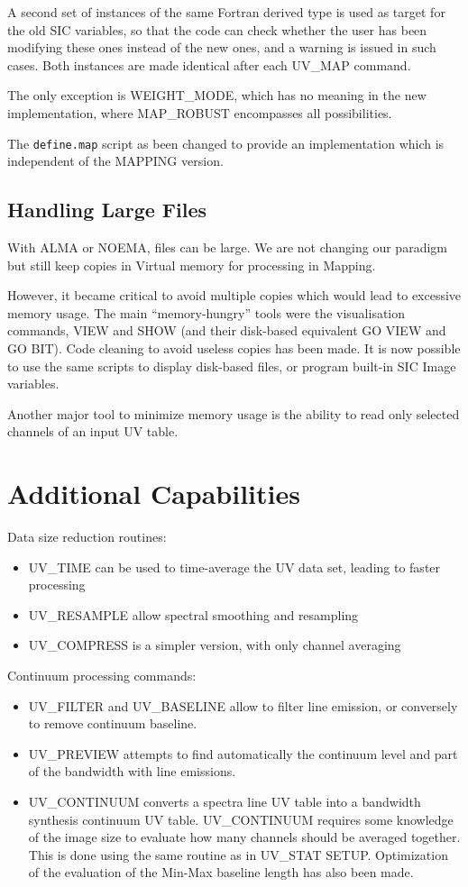 \documentclass[11pt]{article}
\begin{document}
A second set of instances of the same Fortran derived type is used as target
for the old SIC variables, so that the code can check whether the user has been
modifying these ones instead of the new ones, and a warning is issued in such cases.
Both instances are made identical after each UV\_MAP command.

The only exception is WEIGHT\_MODE, which has no meaning in the new implementation,
where MAP\_ROBUST encompasses all possibilities.

The  \texttt{define.map} script as been changed to provide an implementation which
is independent of the MAPPING version.

\subsection{Handling Large Files}
With ALMA or NOEMA, files can be large. We are not changing our paradigm
but still keep copies in Virtual memory for processing in Mapping. 

However, it became critical to avoid multiple copies which would lead
to excessive memory usage. 
The main ``memory-hungry'' tools were the visualisation commands, VIEW
and SHOW (and their disk-based equivalent GO VIEW and GO BIT). Code cleaning
to avoid useless copies has been made. It is now possible to use 
the same scripts to display disk-based files, or program built-in 
SIC Image variables. 

Another major tool to minimize memory usage is the ability
to read only selected channels of an input UV table.

\section{Additional Capabilities}

Data size reduction routines:
\begin{itemize}
\item UV\_TIME  can be used to time-average the UV data set, leading
to faster processing
\item UV\_RESAMPLE allow spectral smoothing and resampling
\item UV\_COMPRESS is a simpler version, with only channel averaging
\end{itemize}

Continuum processing commands:
\begin{itemize}
\item UV\_FILTER and UV\_BASELINE allow to filter line emission, or
conversely to remove continuum baseline.
\item UV\_PREVIEW attempts to find automatically the continuum level
and part of the bandwidth with line emissions.
\item UV\_CONTINUUM converts a spectra line UV table into a bandwidth 
synthesis continuum UV table. UV\_CONTINUUM requires some knowledge of 
the image size to evaluate how many channels should be averaged 
together. This is done using the same routine as in UV\_STAT SETUP. 
Optimization of the evaluation of the Min-Max baseline length has also 
been made.
\end{itemize}
\end{document}

